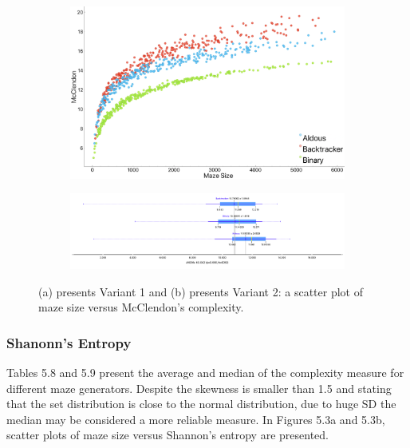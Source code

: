        \begin{figure}[!h]
            \centering
            \begin{subfigure}[!h]{0.7\textwidth}
               \includegraphics[width=1\linewidth]{MClendon_variant1.png}
               \caption{}
            \end{subfigure}
            \begin{subfigure}[!h]{0.7\textwidth}
               \includegraphics[width=1\linewidth]{McClendon_variant2.png}
               \caption{}
            \end{subfigure}
            \caption{(a) presents Variant 1 and (b) presents Variant 2: a scatter plot of maze size versus McClendon's complexity.}
            \end{figure}%
\subsubsection{Shanonn's Entropy}
Tables 5.8 and 5.9 present the average and median of the complexity measure for different maze generators. Despite the skewness is smaller than 1.5 and stating that the set
distribution is close to the normal distribution, due to huge SD the median may be considered a more reliable measure. In Figures 5.3a and 5.3b, scatter
plots of maze size versus Shannon's entropy are presented.\\


